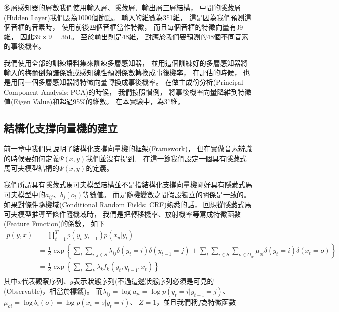     多層感知器的層數我們使用輸入層、隱藏層、輸出層三層結構，
    中間的隱藏層(Hidden Layer)我們設為1000個節點。
    輸入的維數為351維，
    這是因為我們預測這個音框的音素時，
    使用前後四個音框當作特徵，
    而且每個音框的特徵向量有39維，
    因此$39 \times 9 = 351$。
    至於輸出則是48維，
    對應於我們要預測的48個不同音素的事後機率。

    我們使用全部的訓練語料集來訓練多層感知器，
    並用這個訓練好的多層感知器將輸入的梅爾倒頻譜係數或感知線性預測係數轉換成事後機率，
    在評估的時候，
    也是用同一個多層感知器將特徵向量轉換成事後機率。
    在做主成份分析(Principal Component Analysis; PCA)的時候，
    我們按照慣例，
    將事後機率向量降維到特徵值(Eigen Value)和超過95\%的維數。
    在本實驗中，為37維。

  \subsection{結構化支撐向量機的建立}
    前一章中我們只說明了結構化支撐向量機的框架(Framework)，
    但在實做音素辨識的時候要如何定義$\Psi(x, y)$我們並沒有提到。
    在這一節我們設定一個具有隱藏式馬可夫模型結構的$\Psi(x, y)$的定義。
    
    我們所謂具有隱藏式馬可夫模型結構並不是指結構化支撐向量機剛好具有隱藏式馬可夫模型中的$a_{ij}$、$b_j(o_t)$等數值。
    而是隨機變數之間假設獨立的關係是一致的。
    如果對條件隨機域(Conditional Random Fields; CRF)熟悉的話，
    回想從隱藏式馬可夫模型推導至條件隨機域時，
    我們是把轉移機率、放射機率等寫成特徵函數(Feature Function)的係數，
    如下
    \begin{equation}
      \begin{split}
      p(y, x) 
      & = \prod_{t=1}^T p(y_t | y_{t-1}) p(x_y | y_t) \\
      & = \frac{1}{Z} \exp \left\lbrace \sum_{t} \sum_{i,j \in S} \lambda_{ij} \delta(y_t = i) \delta(y_{t-1} = j) + \sum_{t} \sum_{i \in S} \sum_{o \in O_w} \mu_{oi} \delta(y_t = i) \delta(x_t = o) \right\rbrace \\
      & = \frac{1}{Z} \exp \left\lbrace \sum_t \sum_k \lambda_k f_k(y_t, y_{t-1}, x_t) \right\rbrace \\
      \end{split}
    \end{equation}
    其中$x$代表觀察序列、$y$表示狀態序列(不過這邊狀態序列必須是可見的(Observable)，相當於標籤)。
    而$\lambda_{ij} = \log a_{ji} = \log p(y_t = i | y_{t-1} = j)$、
    $\mu_{oi} = \log b_i(o) = \log p(x_t = o | y_t = i)$、
    $Z = 1$，並且我們稱$f$為特徵函數

